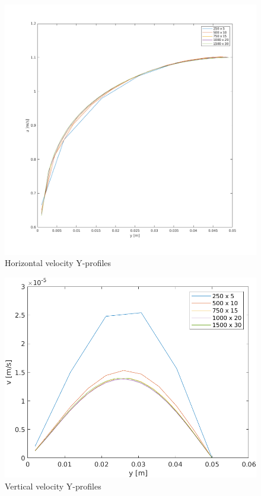 \documentclass[12pt]{article}
\begin{document}
        \begin{figure}[ht!]
                \centering
                \includegraphics[width=\textwidth]{U_Independence.png}
                \caption{Horizontal velocity Y-profiles}
                \label{fig:U_Ind}
        \end{figure}

        \begin{figure}[ht!]
                \centering
                \includegraphics[width=\textwidth]{V_Independence.png}
                \caption{Vertical velocity Y-profiles}
                \label{fig:V_Ind}
        \end{figure}
\end{document}
